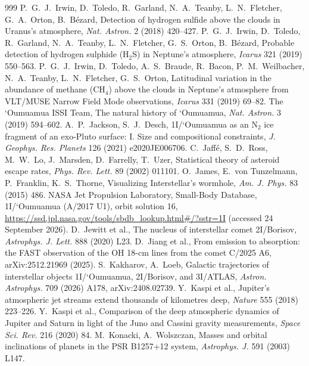 \documentclass[11pt]{article}
\theoremstyle{definition}\newtheorem{definition}[theorem]{Definition}
\theoremstyle{remark}\newtheorem{remark}[theorem]{Remark}
\begin{document}
\begin{thebibliography}{999}
 P.~G.~J.~Irwin, D.~Toledo, R.~Garland, N.~A.~Teanby, L.~N.~Fletcher, G.~A.~Orton, B.~B\'ezard, Detection of hydrogen sulfide above the clouds in Uranus's atmosphere, \emph{Nat. Astron.} 2 (2018) 420--427.
 P.~G.~J.~Irwin, D.~Toledo, R.~Garland, N.~A.~Teanby, L.~N.~Fletcher, G.~S.~Orton, B.~B\'ezard, Probable detection of hydrogen sulphide (H$_2$S) in Neptune's atmosphere, \emph{Icarus} 321 (2019) 550--563.
 P.~G.~J.~Irwin, D.~Toledo, A.~S.~Braude, R.~Bacon, P.~M.~Weilbacher, N.~A.~Teanby, L.~N.~Fletcher, G.~S.~Orton, Latitudinal variation in the abundance of methane (CH$_4$) above the clouds in Neptune's atmosphere from VLT/MUSE Narrow Field Mode observations, \emph{Icarus} 331 (2019) 69--82.
 The \textquoteleft Oumuamua ISSI Team, The natural history of \textquoteleft Oumuamua, \emph{Nat. Astron.} 3 (2019) 594--602.
 A.~P.~Jackson, S.~J.~Desch, 1I/\textquoteleft Oumuamua as an N$_2$ ice fragment of an exo-Pluto surface: I. Size and compositional constraints, \emph{J. Geophys. Res. Planets} 126 (2021) e2020JE006706.
 C.~Jaff\'e, S.~D.~Ross, M.~W.~Lo, J.~Marsden, D.~Farrelly, T.~Uzer, Statistical theory of asteroid escape rates, \emph{Phys. Rev. Lett.} 89 (2002) 011101.
 O.~James, E.~von Tunzelmann, P.~Franklin, K.~S.~Thorne, Visualizing Interstellar's wormhole, \emph{Am. J. Phys.} 83 (2015) 486.
 NASA Jet Propulsion Laboratory, Small-Body Database, 1I/\textquoteleft Oumuamua (A/2017 U1), orbit solution 16, \url{https://ssd.jpl.nasa.gov/tools/sbdb_lookup.html#/?sstr=1I} (accessed 24 September 2026).
 D.~Jewitt et al., The nucleus of interstellar comet 2I/Borisov, \emph{Astrophys. J. Lett.} 888 (2020) L23.
 D.~Jiang et al., From emission to absorption: the FAST observation of the OH 18-cm lines from the comet C/2025 A6, arXiv:2512.21969 (2025).
 S.~Kakharov, A.~Loeb, Galactic trajectories of interstellar objects 1I/\textquoteleft Oumuamua, 2I/Borisov, and 3I/ATLAS, \emph{Astron. Astrophys.} 709 (2026) A178, arXiv:2408.02739.
 Y.~Kaspi et al., Jupiter's atmospheric jet streams extend thousands of kilometres deep, \emph{Nature} 555 (2018) 223--226.
 Y.~Kaspi et al., Comparison of the deep atmospheric dynamics of Jupiter and Saturn in light of the Juno and Cassini gravity measurements, \emph{Space Sci. Rev.} 216 (2020) 84.
 M.~Konacki, A.~Wolszczan, Masses and orbital inclinations of planets in the PSR B1257+12 system, \emph{Astrophys. J.} 591 (2003) L147.

\end{thebibliography}
\end{document}
